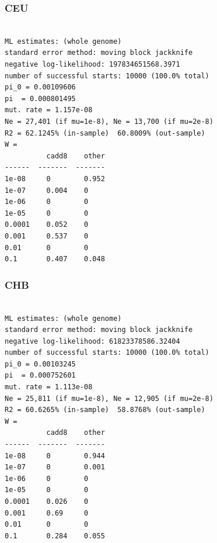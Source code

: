 \documentclass[11pt]{article}
\begin{document}
\subsubsection*{CEU}
\begin{minipage}{\linewidth}\begin{footnotesize}
\begin{verbatim}

ML estimates: (whole genome)
standard error method: moving block jackknife
negative log-likelihood: 197834651568.3971
number of successful starts: 10000 (100.0% total)
pi_0 = 0.00109606
pi  = 0.000801495
mut. rate = 1.157e-08 
Ne = 27,401 (if mu=1e-8), Ne = 13,700 (if mu=2e-8)
R2 = 62.1245% (in-sample)  60.8009% (out-sample)
W = 
          cadd8    other
------  -------  -------
1e-08     0        0.952
1e-07     0.004    0
1e-06     0        0
1e-05     0        0
0.0001    0.052    0
0.001     0.537    0
0.01      0        0
0.1       0.407    0.048
\end{verbatim}
\end{footnotesize}\end{minipage}


\subsubsection*{CHB}
\begin{minipage}{\linewidth}\begin{footnotesize}
\begin{verbatim}

ML estimates: (whole genome)
standard error method: moving block jackknife
negative log-likelihood: 61823378586.32404
number of successful starts: 10000 (100.0% total)
pi_0 = 0.00103245
pi  = 0.000752601
mut. rate = 1.113e-08 
Ne = 25,811 (if mu=1e-8), Ne = 12,905 (if mu=2e-8)
R2 = 60.6265% (in-sample)  58.8768% (out-sample)
W = 
          cadd8    other
------  -------  -------
1e-08     0        0.944
1e-07     0        0.001
1e-06     0        0
1e-05     0        0
0.0001    0.026    0
0.001     0.69     0
0.01      0        0
0.1       0.284    0.055
\end{verbatim}
\end{footnotesize}\end{minipage}
\end{document}
